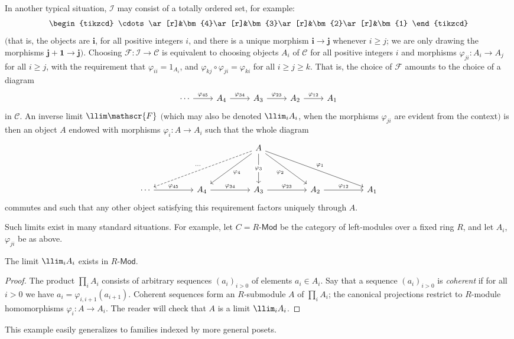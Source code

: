 \begin{example}
In another typical situation, $\mathcal{I}$ may consist of a totally ordered set, for example:
\[\begin{tikzcd}
\cdots\ar[r]&\bm{4}\ar[r]&\bm{3}\ar[r]&\bm{2}\ar[r]&\bm{1}
\end{tikzcd}\]
$($that is, the objects are $\bm{i}$, for all positive integers $i$, and there is a unique morphism
$\bm{i}\to \bm{j}$ whenever $i\geq j$; we are only drawing the morphisms $\bm{j}+\bm{1}\to \bm{j}$$)$. Choosing $\mathscr{F}:\mathcal{I}\to\mathcal{C}$ is equivalent to choosing objects $A_i$ of $\mathcal{C}$ for all positive integers $i$ and morphisms $\varphi_{ji}:A_i\to A_j$ for all $i\geq j$, with the requirement that $\varphi_{ii}=1_{A_i}$, and $\varphi_{kj}\circ\varphi_{ji}=\varphi_{ki}$ for all $i\geq j\geq k$. That is, the choice of $\mathscr{F}$ amounts to the choice of a diagram
\[\begin{tikzcd}
\cdots\ar[r,"\varphi_{45}"]&A_4\ar[r,"\varphi_{34}"]&A_3\ar[r,"\varphi_{23}"]&A_2\ar[r,"\varphi_{12}"]&A_1
\end{tikzcd}\]
in $\mathcal{C}$. An inverse limit $\llim\mathscr{F}$ $($which may also be denoted $\llim_iA_i$, when the morphisms $\varphi_{ji}$ are evident from the context$)$ is then an object $A$ endowed with morphisms $\varphi_i:A\to A_i$ such that the whole diagram
\[\begin{tikzcd}
&&&&A\ar[lllldd,swap,dashed,"\cdots"]\ar[lldd,"\varphi_4"]\ar[dd,"\varphi_3" description]\ar[rrdd,swap,"\varphi_2"]\ar[rrrrdd,"\varphi_1"]&&&&\\
&&&&\\
\cdots\ar[rr,"\varphi_{45}"]&&A_4\ar[rr,"\varphi_{34}"]&&A_3\ar[rr,"\varphi_{23}"]&&A_2\ar[rr,"\varphi_{12}"]&&A_1
\end{tikzcd}\]
commutes and such that any other object satisfying this requirement factors uniquely through $A$.\par
Such limits exist in many standard situations. For example, let $C=R$-$\mathsf{Mod}$ be
the category of left-modules over a fixed ring $R$, and let $A_i$, $\varphi_{ji}$ be as above.
\begin{proposition}
The limit $\llim_iA_i$ exists in $R$-$\mathsf{Mod}$.
\end{proposition}
\begin{proof}
The product $\prod_iA_i$ consists of arbitrary sequences $(a_i)_{i>0}$ of elements $a_i\in A_i$. Say that a sequence $(a_i)_{i>0}$ is \textit{coherent} if for all $i>0$ we have $a_i=\varphi_{i,i+1}(a_{i+1})$. Coherent sequences form an $R$-submodule $A$ of $\prod_iA_i$; the canonical projections restrict to $R$-module homomorphisms $\varphi_i:A\to A_i$. The reader will check that $A$ is a limit $\llim_iA_i$.
\end{proof}
This example easily generalizes to families indexed by more general posets.
\end{example}
